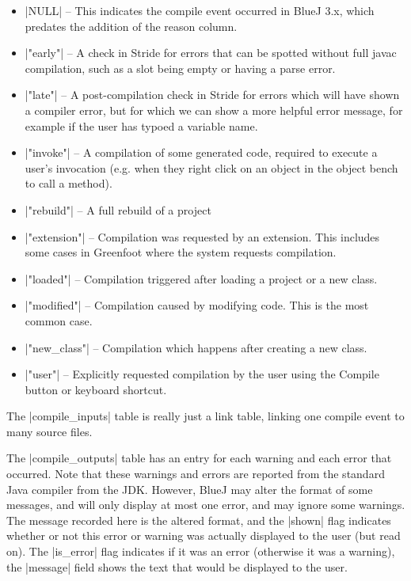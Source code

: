 \documentclass{report}
\begin{document}
\begin{itemize}
\item |NULL| -- This indicates the compile event occurred in BlueJ 3.x, which predates
the addition of the reason column.
\item |"early"| -- A check in Stride for errors that can be spotted without full javac
 compilation, such as a slot being empty or having a parse error.
\item |"late"| -- A post-compilation check in Stride for errors which will have shown
a compiler error, but for which we can show a more helpful error message, for example if
 the user has typoed a variable name.
\item |"invoke"| -- A compilation of some generated code, required to execute a user's
invocation (e.g. when they right click on an object in the object bench to call a method).
\item |"rebuild"| -- A full rebuild of a project
\item |"extension"| -- Compilation was requested by an extension.  This includes some cases
in Greenfoot where the system requests compilation.
\item |"loaded"| -- Compilation triggered after loading a project or a new class.
\item |"modified"| -- Compilation caused by modifying code.  This is the most common case.
\item |"new_class"| -- Compilation which happens after creating a new class.
\item |"user"| -- Explicitly requested compilation by the user using the Compile button
or keyboard shortcut.
\end{itemize}


The |compile_inputs| table is really just a link table, linking one compile
event to many source files.


The |compile_outputs| table has an entry for each warning and each error that
occurred.  Note that these warnings and errors are reported from the standard Java
compiler from the JDK.  However, BlueJ may alter the format of some messages,
and will only display at most one error, and may ignore some warnings.  The
message recorded here is the altered format, and the |shown| flag indicates
whether or not this error or warning was actually displayed to the user (but read on).  The
|is_error| flag indicates if it was an error (otherwise it was a warning), the
|message| field shows the text that would be displayed to the user.
\end{document}
